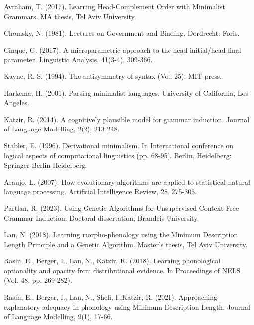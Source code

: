 \documentclass{article}
\begin{document}
\begin{thebibliography}{} %

Avraham, T. (2017). 
Learning Head-Complement Order with Minimalist Grammars.
MA thesis, Tel Aviv University.

Chomsky, N. (1981). 
Lectures on Government and Binding.
Dordrecht: Foris.

Cinque, G. (2017). 
A microparametric approach to the head-initial/head-final parameter. 
Linguistic Analysis, 41(3-4), 309-366.

Kayne, R. S. (1994). 
The antisymmetry of syntax (Vol. 25). 
MIT press.

Harkema, H. (2001). 
Parsing minimalist languages. 
University of California, Los Angeles.

Katzir, R. (2014). 
A cognitively plausible model for grammar induction. 
Journal of Language Modelling, 2(2), 213-248.

Stabler, E. (1996). 
Derivational minimalism. In International conference on logical aspects of computational linguistics (pp. 68-95). 
Berlin, Heidelberg: Springer Berlin Heidelberg.

Araujo, L. (2007). 
How evolutionary algorithms are applied to statistical natural language processing. 
Artificial Intelligence Review, 28, 275-303.

Partlan, R. (2023). 
Using Genetic Algorithms for Unsupervised Context-Free Grammar Induction.
Doctoral dissertation, Brandeis University.

Lan, N. (2018). 
Learning morpho-phonology using the Minimum Description Length Principle and a Genetic Algorithm.
Master’s thesis, Tel Aviv University.

Rasin, E., Berger, I., Lan, N.,  Katzir, R. (2018). 
Learning phonological optionality and opacity from distributional evidence. 
In Proceedings of NELS (Vol. 48, pp. 269-282).

Rasin, E., Berger, I., Lan, N., Shefi, I.,Katzir, R. (2021). 
Approaching explanatory adequacy in phonology using Minimum Description Length. 
Journal of Language Modelling, 9(1), 17-66.


\end{thebibliography}
\end{document}
